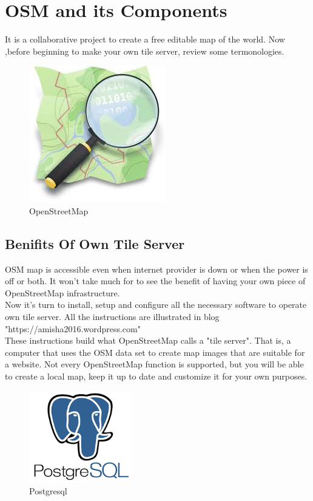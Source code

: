 \section{OSM and its Components }
It is a collaborative project to create a free editable map of the world.
Now ,before beginning to make your own tile server, review some termonologies.
\begin{figure}[ht]
\centering \includegraphics[scale=0.6]{input/images/index.jpeg}
\caption{OpenStreetMap}
\end{figure}

\subsection{Benifits Of Own Tile Server}
 OSM map is accessible even when internet provider is down or when the power is off or both. It won't take much for to see the benefit of having your own piece of OpenStreetMap infrastructure.\\
Now it's turn to install, setup and configure all the necessary software to operate own tile server. All the instructions are illustrated in blog "https://amisha2016.wordpress.com"\\
These instructions build what OpenStreetMap calls a "tile server". That is, a computer that uses the OSM data set to create map images that are suitable for a website. Not every OpenStreetMap function is supported, but you will be able to create a local map, keep it up to date and customize it for your own purposes.
\begin{figure}[!ht]
\centering
\includegraphics[width=0.4\textwidth]{input/images/index.png}                   
\caption{Postgresql}
\hspace{-1.5em}
\end{figure}


